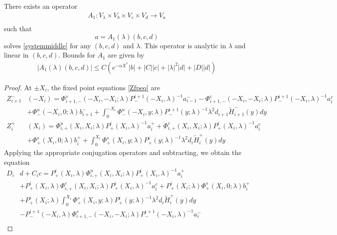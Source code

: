 \documentclass[thesis.tex]{subfiles}
\begin{document}
\begin{lemma}\label{Zinv1}
There exists an operator
\begin{align*}
A_1: V_\lambda \times V_b \times V_c \times V_d \rightarrow V_a \\
\end{align*}
such that 
\[
a = A_1(\lambda)(b, c, d)
\]
solves \eqref{systemmiddle} for any $(b, c, d)$ and $\lambda$. This operator is analytic in $\lambda$ and linear in $(b, c, d)$. Bounds for $A_1$ are given by
\begin{align}\label{A1bound}
|A_1(\lambda)(b, c, d)| \leq C \left( e^{-\alpha X^*} |b| + |C||c| + |\lambda|^2 |d| + |D||d| \right)
\end{align} 

\begin{proof}
At $\pm X_i$, the fixed point equations \eqref{Zfpeq} are
\begin{align*}
Z_{i+1}^-&(-X_i) = \Phi^s_{i+1,-}(-X_i, -X_i; \lambda) P^{i+1}_-(-X_i, \lambda)^{-1} a_{i-1}^-  - \Phi^c_{i+1,-}(-X_i, -X_i; \lambda) P^{i+1}_-(-X_i, \lambda)^{-1} a_i^c \\ 
&+ \Phi^u_-(-X_i, 0; \lambda) b_{i+1}^-
+ \int_0^{-X_i} \Phi^u_-(-X_i, y; \lambda) P^{i+1}_-(y; \lambda)^{-1} \lambda^2 d_{i+1} \tilde{H}_{i+1}^-(y) dy \\
Z_i^+&(X_i) = \Phi^u_{i,+}(X_i, X_i; \lambda) P^i_+(X_i, \lambda)^{-1} a_i^+ + \Phi^c_{i,+}(X_i, X_i; \lambda) P^i_+(X_i, \lambda)^{-1} a_i^c \\
&+ \Phi^s_+(X_i, 0; \lambda) b_i^+ 
+ \int_0^{X_i} \Phi^s_+(X_i, y; \lambda) P^i_+(y; \lambda)^{-1} \lambda^2 d_i \tilde{H}_i^+(y) dy
\end{align*}
Applying the appropriate conjugation operators and subtracting, we obtain the equation 
\begin{equation}\label{Dideq0}
\begin{aligned}
D_i &d + C_i c = P^i_+(X_i, \lambda) \Phi^u_{i,+}(X_i, X_i; \lambda) P^i_+(X_i, \lambda)^{-1} a_i^+ \\
&+ P^i_+(X_i, \lambda) \Phi^c_{i,+}(X_i, X_i; \lambda) P^i_+(X_i, \lambda)^{-1} a_i^c 
+ P^i_+(X_i; \lambda)\Phi^s_+(X_i, 0; \lambda) b_i^+ \\
&+ P^i_+(X_i; \lambda) \int_0^{X_i} \Phi^s_+(X_i, y; \lambda) P^i_+(y; \lambda)^{-1} \lambda^2 d_i \tilde{H}_i^+(y) dy \\
&- P^{i+1}_-(-X_i, \lambda) \Phi^s_{i+1,-}(-X_i,-X_i; \lambda) P^{i+1}_-(-X_i, \lambda)^{-1} a_i^- \\

\end{aligned}
\end{equation}
\end{proof}
\end{lemma}
\end{document}
